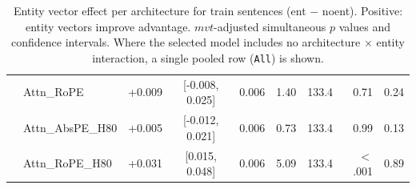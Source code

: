 \begin{table}[t]
\begin{tabular}{@{}llrcrrrrr@{}}
 & Attn\_RoPE & +0.009 & [-0.008, 0.025] & 0.006 & 1.40 & 133.4 & 0.71 & 0.24 \\
 & Attn\_AbsPE\_H80 & +0.005 & [-0.012, 0.021] & 0.006 & 0.73 & 133.4 & 0.99 & 0.13 \\
 & Attn\_RoPE\_H80 & +0.031 & [0.015, 0.048] & 0.006 & 5.09 & 133.4 & $<$.001 & 0.89 \\
\bottomrule
\end{tabular}
\caption{Entity vector effect per architecture for train sentences (ent $-$ noent). Positive: entity vectors improve advantage. $mvt$-adjusted simultaneous $p$ values and confidence intervals. Where the selected model includes no architecture $\times$ entity interaction, a single pooled row (\texttt{All}) is shown.}
\label{tab:train_entity_effect}
\end{table}
